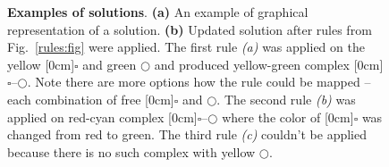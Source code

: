 \documentclass[12pt]{fithesis2}
\begin{document}
\begin{figure}[!h]
\begin{center}
\caption{\textbf{Examples of solutions}. \textbf{(a)} An example of graphical representation of a solution. \textbf{(b)} Updated solution after rules from Fig.~\ref{rules:fig} were applied. The first rule \textit{(a)} was applied on the yellow \raisebox{-0.02cm}[0cm]{{\large $\square$}} and green $\bigcirc$ and produced yellow-green complex \raisebox{-0.02cm}[0cm]{{\large $\square$}}--$\bigcirc$. Note there are more options how the rule could be mapped -- each combination of free \raisebox{-0.02cm}[0cm]{{\large $\square$}} and $\bigcirc$. The second rule \textit{(b)} was applied on red-cyan complex \raisebox{-0.02cm}[0cm]{{\large $\square$}}--$\bigcirc$ where the color of \raisebox{-0.02cm}[0cm]{{\large $\square$}} was changed from red to green. The third rule \textit{(c)} couldn't be applied because there is no such complex with yellow $\bigcirc$. }
\label{solutions:fig}
\end{center}
\end{figure}
\end{document}
